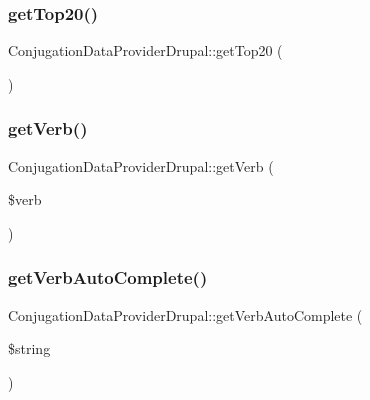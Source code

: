 \hypertarget{class_conjugation_data_provider_drupal_a03d4d222c04d356e818db0ffd86aab24}{}\label{class_conjugation_data_provider_drupal_a03d4d222c04d356e818db0ffd86aab24} 
\subsubsection{\texorpdfstring{get\+Top20()}{getTop20()}}
{\footnotesize\ttfamily Conjugation\+Data\+Provider\+Drupal\+::get\+Top20 (\begin{DoxyParamCaption}{ }\end{DoxyParamCaption})}

\hypertarget{class_conjugation_data_provider_drupal_ade8bf964b9e3e855cdafcf620b183fe4}{}\label{class_conjugation_data_provider_drupal_ade8bf964b9e3e855cdafcf620b183fe4} 
\subsubsection{\texorpdfstring{get\+Verb()}{getVerb()}}
{\footnotesize\ttfamily Conjugation\+Data\+Provider\+Drupal\+::get\+Verb (\begin{DoxyParamCaption}\item[{}]{\$verb }\end{DoxyParamCaption})}

\hypertarget{class_conjugation_data_provider_drupal_a52b438cebc357aac7364f344a19a3df4}{}\label{class_conjugation_data_provider_drupal_a52b438cebc357aac7364f344a19a3df4} 
\subsubsection{\texorpdfstring{get\+Verb\+Auto\+Complete()}{getVerbAutoComplete()}}
{\footnotesize\ttfamily Conjugation\+Data\+Provider\+Drupal\+::get\+Verb\+Auto\+Complete (\begin{DoxyParamCaption}\item[{}]{\$string }\end{DoxyParamCaption})}

